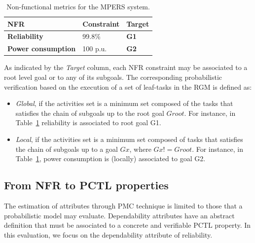\begin{table}[h]
{\renewcommand{\arraystretch}{1.5}
\begin{tabularx}{\textwidth}{@{}XXX@{}}
\toprule
\textbf{NFR}               & \textbf{Constraint} & \textbf{Target}        \\ \midrule
\textbf{Reliability}       & 99.8\%            & \textbf{G1} \\
\textbf{Power consumption} & 100 p.u.            & \textbf{G2}          \\ \bottomrule
\end{tabularx}
}
\caption{Non-functional metrics for the MPERS system.}
\label{tab:MPERS_NFR}
\end{table}


As indicated by the \textit{Target} column, each NFR constraint may be associated to a root level goal or to any of its subgoals. The corresponding probabilistic verification based on the execution of a set of leaf-tasks in the RGM is defined as:

\begin{itemize}

\item \textit{Global}, if the activities set is a minimum set composed of the tasks that satisfies the chain of subgoals up to the root goal $Groot$. For instance, in Table~\ref{tab:MPERS_NFR} reliability is associated to root goal G1.
\medskip

\item \textit{Local}, if the activities set is a minimum set composed of tasks that satisfies the chain of subgoals up to a goal $Gx$, where $Gx != Groot$. For instance, in Table~\ref{tab:MPERS_NFR}, power consumption is (locally) associated to goal G2.
\medskip

\end{itemize}


\subsection{From NFR to PCTL properties}

The estimation of attributes through PMC technique is limited to those that a probabilistic model may evaluate. Dependability attributes have an abstract definition that must be associated to a concrete and verifiable PCTL property. In this evaluation, we focus on the dependability attribute of reliability. 

